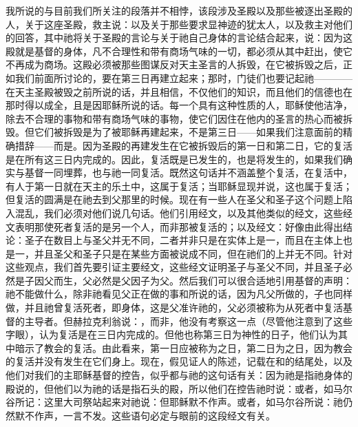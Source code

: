 我所说的与目前我们所关注的段落并不相悖，该段涉及圣殿以及那些被逐出圣殿的人，关于这座圣殿，救主说：以及关于那些要求显神迹的犹太人，以及救主对他们的回答，其中祂将关于圣殿的言论与关于祂自己身体的言论结合起来，说：因为这殿就是基督的身体，凡不合理性和带有商场气味的一切，都必须从其中赶出，使它不再成为商场。这殿必须被那些图谋反对天主圣言的人拆毁，在它被拆毁之后，正如我们前面所讨论的，要在第三日再建立起来；那时，门徒们也要记起祂————在天主圣殿被毁之前所说的话，并且相信，不仅他们的知识，而且他们的信德也在那时得以成全，且是因耶稣所说的话。每一个具有这种性质的人，耶稣使他洁净，除去不合理的事物和带有商场气味的事物，使它们因住在他内的圣言的热心而被拆毁。但它们被拆毁是为了被耶稣再建起来，不是第三日——如果我们注意面前的精确措辞——而是。因为圣殿的再建发生在它被拆毁后的第一日和第二日，它的复活是在所有这三日内完成的。因此，复活既是已发生的，也是将发生的，如果我们确实与基督一同埋葬，也与祂一同复活。既然这句话并不涵盖整个复活，在复活中，有人于第一日就在天主的乐土中，这属于复活；当耶稣显现并说，这也属于复活；但复活的圆满是在祂去到父那里的时候。现在有一些人在圣父和圣子这个问题上陷入混乱，我们必须对他们说几句话。他们引用经文，以及其他类似的经文，这些经文表明那使死者复活的是另一个人，而非那被复活的；以及经文：好像由此得出结论：圣子在数目上与圣父并无不同，二者并非只是在实体上是一，而且在主体上也是一，并且圣父和圣子只是在某些方面被说成不同，但在祂们的上并无不同。针对这些观点，我们首先要引证主要经文，这些经文证明圣子与圣父不同，并且圣子必然是子因父而生，父必然是父因子为父。然后我们可以很合适地引用基督的声明：祂不能做什么，除非祂看见父正在做的事和所说的话，因为凡父所做的，子也同样做，并且祂曾复活死者，即身体，这是父准许祂的，父必须被称为从死者中复活基督的主导者。但赫拉克利翁说：，而非，他没有考察这一点（尽管他注意到了这些字眼），认为复活是在三日内完成的。但他也称第三日为神性的日子，他们认为其中暗示了教会的复活。由此看来，第一日应被称为之日，第二日为之日，因为教会的复活并没有发生在它们身上。现在，假见证人的陈述，记载在和的结尾处，以及他们对我们的主耶稣基督的控告，似乎都与祂的这句话有关：因为祂是指祂身体的殿说的，但他们以为祂的话是指石头的殿，所以他们在控告祂时说：或者，如马尔谷所记：这里大司祭站起来对祂说：但耶稣默不作声。或者，如马尔谷所说：祂仍然默不作声，一言不发。这些语句必定与眼前的这段经文有关。\par

